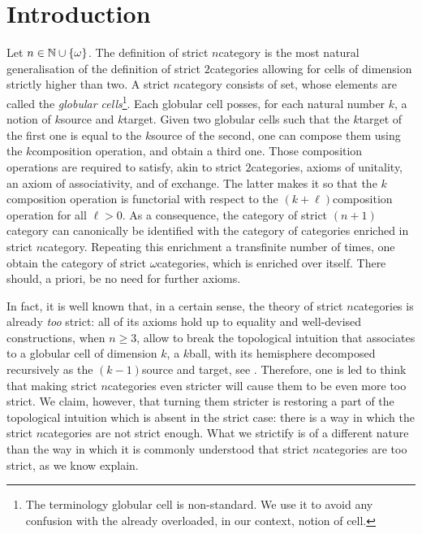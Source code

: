 \section{Introduction}

Let \( n \in \mathbb{N} \cup \left\{ {\omega} \right\} \).
The definition of strict \( n \)\nbd category is the most natural generalisation of the definition of strict \( 2 \)\nbd categories allowing for cells of dimension strictly higher than two.
A strict \( n \)\nbd category \cite{brown1981groupoids} consists of set, whose elements are called the \emph{globular cells}\footnote{The terminology globular cell is non-standard. We use it to avoid any confusion with the already overloaded, in our context, notion of cell.}.
Each globular cell posses, for each natural number \( k \), a notion of \( k \)\nbd source and \( k \)\nbd target. 
Given two globular cells such that the \( k \)\nbd target of the first one is equal to the \( k \)\nbd source of the second, one can compose them using the \( k \)\nbd composition operation, and obtain a third one.
Those composition operations are required to satisfy, akin to strict \( 2 \)\nbd categories, axioms of unitality, an axiom of associativity, and of exchange.
The latter makes it so that the \( k \)\nbd composition operation is functorial with respect to the \( (k + \ell) \)\nbd composition operation for all \( \ell > 0 \).
As a consequence, the category of strict \( (n + 1) \)\nbd category can canonically be identified with the category of categories enriched in strict \( n \)\nbd category. 
Repeating this enrichment a transfinite number of times, one obtain the category of strict \( \omega \)\nbd categories, which is enriched over itself.
There should, a priori, be no need for further axioms.   

In fact, it is well known that, in a certain sense, the theory of strict \( n \)\nbd categories is already \emph{too} strict: all of its axioms hold up to equality and well-devised constructions, when \( n \geq 3 \), allow to break the topological intuition that associates to a globular cell of dimension \( k \), a \( k \)\nbd ball, with its hemisphere decomposed recursively as the \( (k - 1) \)\nbd source and target, see \cite{simpson1998homotopy}.
Therefore, one is led to think that making strict \( n \)\nbd categories even stricter will cause them to be even more too strict.
We claim, however, that turning them stricter is restoring a part of the topological intuition which is absent in the strict case: there is a way in which the strict \( n \)\nbd categories are not strict enough.
What we strictify is of a different nature than the way in which it is commonly understood that strict \( n \)\nbd categories are too strict, as we know explain.


